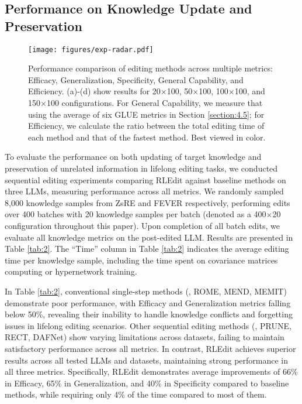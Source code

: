 \subsection{Performance on Knowledge Update and Preservation}
\begin{figure}
    \centering
    \texttt{[image: figures/exp-radar.pdf]}
    \captionsetup{skip=8pt}
    \caption{Performance comparison of editing methods across multiple metrics: Efficacy, Generalization, Specificity, General Capability, and Efficiency. (a)-(d) show results for 20$\times$100, 50$\times$100, 100$\times$100, and 150$\times$100 configurations. For General Capability, we measure that using the average of six GLUE metrics in Section \ref{section:4.5}; for Efficiency, we calculate the ratio between the total editing time of each method and that of the fastest method. Best viewed in color.}
    \label{fig:rader}
\end{figure}
To evaluate the performance on both updating of target knowledge and preservation of unrelated information in lifelong editing tasks, we conducted sequential editing experiments comparing RLEdit against baseline methods on three LLMs, measuring performance across all metrics. We randomly sampled 8,000 knowledge samples from ZsRE and FEVER respectively, performing edits over 400 batches with 20 knowledge samples per batch (denoted as a 400$\times$20 configuration throughout this paper). Upon completion of all batch edits, we evaluate all knowledge metrics on the post-edited LLM. Results are presented in Table \ref{tab:2}. The ``Time'' column in Table \ref{tab:2} indicates the average editing time per knowledge sample, including the time spent on covariance matrices computing or hypernetwork training.

In Table \ref{tab:2}, conventional single-step methods (\eg, ROME, MEND, MEMIT) demonstrate poor performance, with Efficacy and Generalization metrics falling below 50\%, revealing their inability to handle knowledge conflicts and forgetting issues in lifelong editing scenarios. Other sequential editing methods (\eg, PRUNE, RECT, DAFNet) show varying limitations across datasets, failing to maintain satisfactory performance across all metrics. In contrast, RLEdit achieves superior results across all tested LLMs and datasets, maintaining strong performance in all three metrics. Specifically, RLEdit demonstrates average improvements of 66\% in Efficacy, 65\% in Generalization, and 40\% in Specificity compared to baseline methods, while requiring only 4\% of the time compared to most of them.

